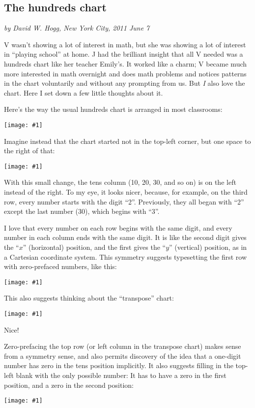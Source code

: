 \documentclass[12pt]{article}
\newcommand{\showchart}[1]{\texttt{[image: \#1]}}
\begin{document}
\subsection*{The hundreds chart}

\noindent
\textsl{by David W. Hogg, New York City, 2011 June 7}
\vspace{1ex}

V wasn't showing a lot of interest in math, but she was showing a lot
of interest in ``playing school'' at home.  J had the brilliant
insight that all V needed was a hundreds chart like her teacher
Emily's.  It worked like a charm; V became much more interested in
math overnight and does math problems and notices patterns in the
chart voluntarily and without any prompting from us.  But \emph{I}
also love the chart.  Here I set down a few little thoughts about it.

Here's the way the usual hundreds chart is arranged in most
classrooms:
\begin{center}
\showchart{hundreds_chart_standard.pdf}
\end{center}

Imagine instead that the chart started not in the top-left corner,
but one space to the right of that:
\begin{center}
\showchart{hundreds_chart_skipzero_nzp.pdf}
\end{center}
With this small change, the tens column (10, 20, 30, and so on) is on
the left instead of the right.  To my eye, it looks nicer, because,
for example, on the third row, every number starts with the digit
``2''.  Previously, they all began with ``2'' except the last number
(30), which begins with ``3''.

I love that every number on each row begins with the same digit, and
every number in each column ends with the same digit.  It is like the
second digit gives the ``$x$'' (horizontal) position, and the first
gives the ``$y$'' (vertical) position, as in a Cartesian coordinate
system.  This symmetry suggests typesetting the first row with
zero-prefaced numbers, like this:
\begin{center}
\showchart{hundreds_chart_skipzero.pdf}
\end{center}
This also suggests thinking about the ``transpose'' chart:
\begin{center}
\showchart{hundreds_chart_transpose_skipzero.pdf}
\end{center}
Nice!

Zero-prefacing the top row (or left column in the transpose chart)
makes sense from a symmetry sense, and also permits discovery of the
idea that a one-digit number has zero in the tens position implicitly.
It also suggests filling in the top-left blank with the only possible
number: It has to have a zero in the first position, and a zero in the
second position:
\begin{center}
\showchart{hundreds_chart_default.pdf}
\end{center}
\end{document}
